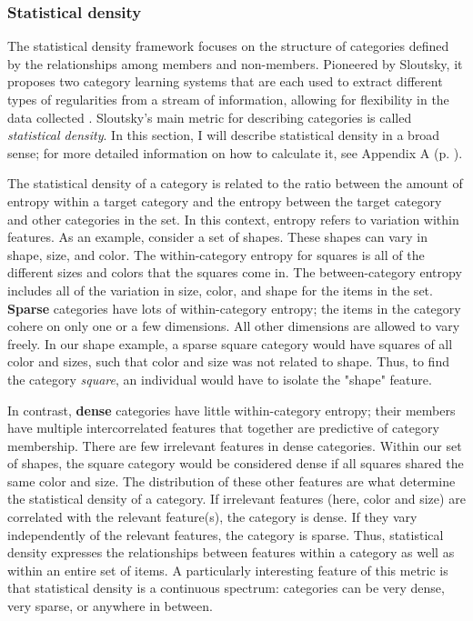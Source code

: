 \documentclass[../dissertation.tex]{subfiles}
\begin{document}
\subsubsection{Statistical density}

The statistical density framework focuses on the structure of categories defined by the relationships among members and non-members. Pioneered by Sloutsky, it proposes two category learning systems that are each used to extract different types of regularities from a stream of information, allowing for flexibility in the data collected \citep{Sloutsky2010}. Sloutsky's main metric for describing categories is called \textit{statistical density}. In this section, I will describe statistical density in a broad sense; for more detailed information on how to calculate it, see Appendix A (p. \pageref{appendixA}). \par
	The statistical density of a category is related to the ratio between the amount of entropy within a target category and the entropy between the target category and other categories in the set. In this context, entropy refers to variation within features. As an example, consider a set of shapes. These shapes can vary in shape, size, and color. The within-category entropy for squares is all of the different sizes and colors that the squares come in. The between-category entropy includes all of the variation in size, color, and shape for the items in the set. \textbf{Sparse} categories have lots of within-category entropy; the items in the category cohere on only one or a few dimensions. All other dimensions are allowed to vary freely. In our shape example, a sparse square category would have squares of all color and sizes, such that color and size was not related to shape. Thus, to find the category \textit{square}, an individual would have to isolate the "shape" feature. \par
	In contrast, \textbf{dense} categories have little within-category entropy; their members have multiple intercorrelated features that together are predictive of category membership. There are few irrelevant features in dense categories. Within our set of shapes, the square category would be considered dense if all squares shared the same color and size. The distribution of these other features are what determine the statistical density of a category. If irrelevant features (here, color and size) are correlated with the relevant feature(s), the category is dense. If they vary independently of the relevant features, the category is sparse. Thus, statistical density expresses the relationships between features within a category as well as within an entire set of items. A particularly interesting feature of this metric is that statistical density is a continuous spectrum: categories can be very dense, very sparse, or anywhere in between. \par 
\end{document}
